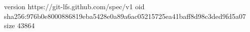 version https://git-lfs.github.com/spec/v1
oid sha256:976b0e8000886819eba5428e0a89a6ac05215725ea41baff8d98c3ded9fd5a07
size 43864

